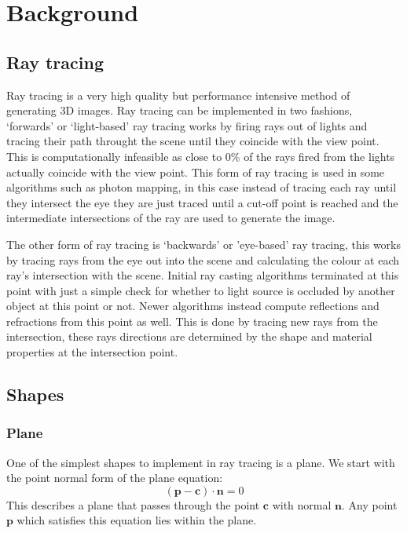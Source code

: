 \section{Background}
  \subsection{Ray tracing}
    Ray tracing is a very high quality but performance intensive method of
    generating 3D images.  Ray tracing can be implemented in two fashions,
    `forwards' or `light-based' ray tracing works by firing rays out of lights
    and tracing their path throught the scene until they coincide with the view
    point. This is computationally infeasible as close to 0\% of the rays fired
    from the lights actually coincide with the view point.  This form of ray
    tracing is used in some algorithms such as photon mapping, in this case
    instead of tracing each ray until they intersect the eye they are just
    traced until a cut-off point is reached and the intermediate intersections
    of the ray are used to generate the image.

    The other form of ray tracing is `backwards' or 'eye-based' ray tracing,
    this works by tracing rays from the eye out into the scene and calculating
    the colour at each ray's intersection with the scene.  Initial ray casting
    algorithms terminated at this point with just a simple check for whether to
    light source is occluded by another object at this point or not.  Newer
    algorithms instead compute reflections and refractions from this point as
    well. This is done by tracing new rays from the intersection, these rays
    directions are determined by the shape and material properties at the
    intersection point.

  \subsection{Shapes}
    \subsubsection{Plane}
      One of the simplest shapes to implement in ray tracing is a plane.  We
      start with the point normal form of the plane equation:
      \[ \left( \mathbf{p} - \mathbf{c} \right) \cdot \mathbf{n} = 0 \]
      This describes a plane that passes through the point $\mathbf{c}$ with
      normal $\mathbf{n}$.  Any point $\mathbf{p}$ which satisfies this equation
      lies within the plane.
